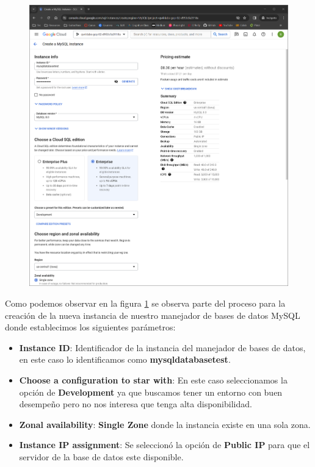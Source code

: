 \documentclass[12pt,a4paper]{article}
\begin{document}
\begin{figure}[H]
    \centering
    \includegraphics[width=.8\linewidth]{M4_Servicios_Cómputo_en_la_Nube/Tarea_6_Creación_sistema_administración_Base_de_Datos/reporte/figuras/2_1_1_Google_DBMS.png}
    \label{fig:2_1_1_Google_DBMS}
\end{figure}

Como podemos observar en la figura \ref{fig:2_1_1_Google_DBMS} se observa parte del proceso para la creación de la nueva instancia de nuestro manejador de bases de datos MySQL donde establecimos los siguientes parámetros:

\begin{itemize}
    \item \textbf{Instance ID}: Identificador de la instancia del manejador de bases de datos, en este caso lo identificamos como \textbf{mysqldatabasetest}.
    \item \textbf{Choose a configuration to star with}: En este caso seleccionamos la opción de \textbf{Development} ya que buscamos tener un entorno con buen desempeño pero no nos interesa que tenga alta disponibilidad.
    \item \textbf{Zonal availability}: \textbf{Single Zone} donde la instancia existe en una sola zona.
    \item \textbf{Instance IP assignment}: Se seleccionó la opción de \textbf{Public IP} para que el servidor de la base de datos este disponible.
\end{itemize}
\end{document}
